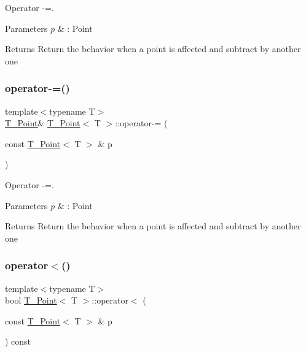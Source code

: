 Operator -\/=. 


\begin{DoxyParams}{Parameters}
{\em p} & \+: Point \\
\hline
\end{DoxyParams}
\begin{DoxyReturn}{Returns}
Return the behavior when a point is affected and subtract by another one 
\end{DoxyReturn}
\mbox{\label{classT__Point_aa438de3090999e1f24f0de58dc5171a0}} 
\subsubsection{\texorpdfstring{operator-\/=()}{operator-=()}\hspace{0.1cm}{\footnotesize\ttfamily [2/2]}}
{\footnotesize\ttfamily template$<$typename T$>$ \\
\hyperlink{classT__Point}{T\+\_\+\+Point}\& \hyperlink{classT__Point}{T\+\_\+\+Point}$<$ T $>$\+::operator-\/= (\begin{DoxyParamCaption}\item[{const \hyperlink{classT__Point}{T\+\_\+\+Point}$<$ T $>$ \&}]{p }\end{DoxyParamCaption})\hspace{0.3cm}{\ttfamily [inline]}}



Operator -\/=. 


\begin{DoxyParams}{Parameters}
{\em p} & \+: Point \\
\hline
\end{DoxyParams}
\begin{DoxyReturn}{Returns}
Return the behavior when a point is affected and subtract by another one 
\end{DoxyReturn}
\mbox{\label{classT__Point_a95cb559fe5888b44481f6ad3aebabefe}} 
\subsubsection{\texorpdfstring{operator$<$()}{operator<()}\hspace{0.1cm}{\footnotesize\ttfamily [1/2]}}
{\footnotesize\ttfamily template$<$typename T$>$ \\
bool \hyperlink{classT__Point}{T\+\_\+\+Point}$<$ T $>$\+::operator$<$ (\begin{DoxyParamCaption}\item[{const \hyperlink{classT__Point}{T\+\_\+\+Point}$<$ T $>$ \&}]{p }\end{DoxyParamCaption}) const\hspace{0.3cm}{\ttfamily [inline]}}



